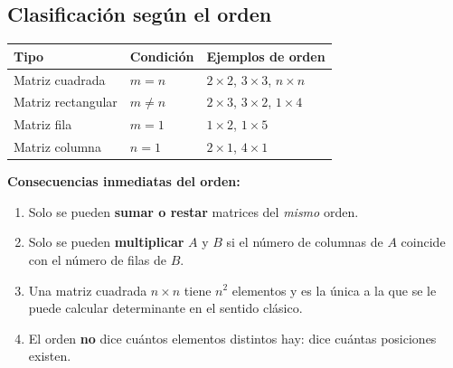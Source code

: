 \documentclass[12pt, letterpaper]{article}
\begin{document}
\begin{center}
\end{center}

\subsection*{Clasificación según el orden}

\begin{center}
\small
\begin{tabular}{@{}lll@{}}
  \toprule
  \textbf{Tipo} & \textbf{Condición} & \textbf{Ejemplos de orden} \\
  \midrule
  Matriz cuadrada     & $m=n$      & $2\times2$, $3\times3$, $n\times n$ \\
  Matriz rectangular  & $m\neq n$  & $2\times3$, $3\times2$, $1\times4$ \\
  Matriz fila         & $m=1$      & $1\times2$, $1\times5$ \\
  Matriz columna      & $n=1$      & $2\times1$, $4\times1$ \\
  \bottomrule
\end{tabular}
\end{center}

\begin{cuadroteoria}
  \small
  \textbf{Consecuencias inmediatas del orden:}
  \begin{enumerate}[leftmargin=1.4em, nosep]
    \item Solo se pueden \textbf{sumar o restar} matrices del \emph{mismo}
          orden.
    \item Solo se pueden \textbf{multiplicar} $A$ y $B$ si el número de
          columnas de $A$ coincide con el número de filas de $B$.
    \item Una matriz cuadrada $n\times n$ tiene $n^2$ elementos y es la
          única a la que se le puede calcular determinante en el sentido
          clásico.
    \item El orden \textbf{no} dice cuántos elementos distintos hay: dice
          cuántas posiciones existen.
  \end{enumerate}
\end{cuadroteoria}
\end{document}
